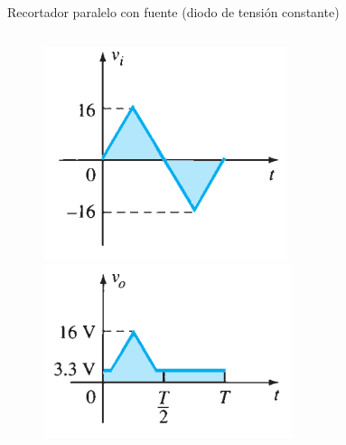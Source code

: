 \documentclass[t,aspectratio=169]{beamer}
\begin{document}
\begin{frame}{Recortador paralelo con fuente (diodo de tensión constante)}
\begin{columns}
\begin{column}{0.25\textwidth}
\begin{figure}
    \centering
    \includegraphics[width=\textwidth]{figures/recortador_serie_ideal_fuente_vcte_1.png}
    \includegraphics[width=\textwidth]{figures/recortador_serie_ideal_fuente_vcte_2.png}
\end{figure}

\end{column}
\end{columns}

\end{frame}
\end{document}
